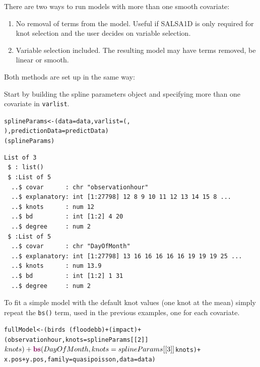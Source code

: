 \noindent There are two ways to run models with more than one smooth covariate:

\begin{enumerate}
\item No removal of terms from the model.  Useful if SALSA1D is only required for knot selection and the user decides on variable selection.
\item Variable selection included.  The resulting model may have terms removed, be linear or smooth.
\end{enumerate}

\noindent Both methods are set up in the same way:

\noindent Start by building the spline parameters object and specifying more than one covariate in {\tt varlist}.
\begin{knitrout}\footnotesize
{}\color{fgcolor}\begin{kframe}
\begin{alltt}
splineParams<-(data=data, varlist=(,
    ), predictionData=predictData)
(splineParams)
\begin{verbatim}
List of 3
 $ : list()
 $ :List of 5
  ..$ covar      : chr "observationhour"
  ..$ explanatory: int [1:27798] 12 8 9 10 11 12 13 14 15 8 ...
  ..$ knots      : num 12
  ..$ bd         : int [1:2] 4 20
  ..$ degree     : num 2
 $ :List of 5
  ..$ covar      : chr "DayOfMonth"
  ..$ explanatory: int [1:27798] 13 16 16 16 16 16 19 19 19 25 ...
  ..$ knots      : num 13.9
  ..$ bd         : int [1:2] 1 31
  ..$ degree     : num 2
\end{verbatim}
\end{alltt}
\end{kframe}
\end{knitrout}

\noindent To fit a simple model with the default knot values (one knot at the mean) simply repeat the {\tt bs()} term, used in the previous examples, one for each covariate.

\begin{knitrout}\footnotesize
{}\color{fgcolor}\begin{kframe}
\begin{alltt}
fullModel<-(birds ~ (floodebb) + (impact) + 
    (observationhour, knots=splineParams[[2]]$knots) + 
    \hlfunctioncall{bs}(DayOfMonth, knots=splineParams[[3]]$knots) + 
    x.pos + y.pos, family=quasipoisson, data=data)
\end{alltt}
\end{kframe}
\end{knitrout}

